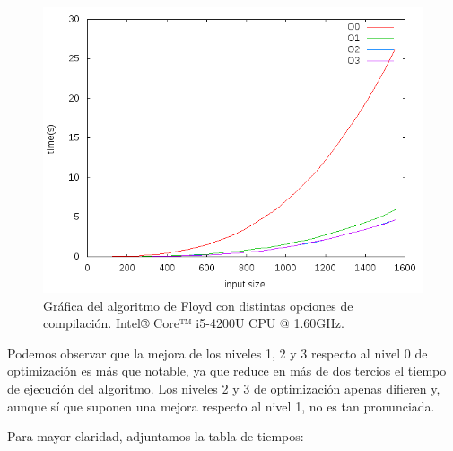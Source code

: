 \documentclass[11pt,a4paper]{article}
\begin{document}
				\begin{figure}[h]

					\centering
					\includegraphics[width=1\textwidth]{floyd_opt.png}
					\caption{Gráfica del algoritmo de Floyd con distintas opciones de compilación. Intel® Core™ i5-4200U CPU @ 1.60GHz.}

				\end{figure}

				\par
				Podemos observar que la mejora de los niveles 1, 2 y 3 respecto al nivel 0 de optimización es más que notable, ya que reduce en más de dos tercios el tiempo de ejecución del algoritmo. Los niveles 2 y 3 de optimización apenas difieren y, aunque sí que suponen una mejora respecto al nivel 1, no es tan pronunciada.

\newpage

				\par
				Para mayor claridad, adjuntamos la tabla de tiempos:
\end{document}

